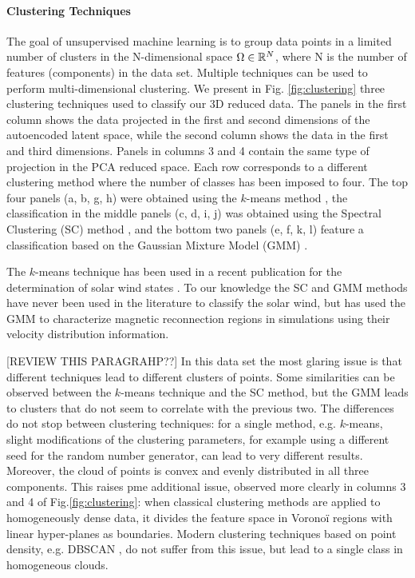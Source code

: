 \paragraph{Clustering Techniques}
The goal of unsupervised machine learning is to group data points in a limited number of clusters in the N-dimensional space $\Omega\in\Bbb R^N$, where N is the number of features (components) in the data set. Multiple techniques can be used to perform multi-dimensional clustering. We present in Fig. \ref{fig:clustering} three clustering techniques used to classify our 3D reduced data. The panels in the first column shows the data projected in the first and second dimensions of the autoencoded latent space, while the second column shows the data in the first and third dimensions. Panels in columns 3 and 4 contain the same type of projection in the PCA reduced space. Each row corresponds to a different clustering method where the number of classes has been imposed to four. The top four panels (a, b, g, h) were obtained using the $k$-means method \citep{[REF??]}, the classification in the middle panels (c, d, i, j) was obtained using the Spectral Clustering (SC) method \citep{[REF??]}, and the bottom two panels (e, f, k, l) feature a classification based on the Gaussian Mixture Model (GMM) \citep{[REF??]}.

The $k$-means technique has been used in a recent publication for the determination of solar wind states \citep{Roberts2020}. To our knowledge the SC and GMM methods have never been used in the literature to classify the solar wind, but \citep{Dupuis2020} has used the GMM to characterize magnetic reconnection regions in simulations using their velocity distribution information.

[REVIEW THIS PARAGRAHP??]
In this data set the most glaring issue is that different techniques lead to different clusters of points. Some similarities can be observed between the $k$-means technique and the SC method, but the GMM leads to clusters that do not seem to correlate with the previous two. The differences do not stop between clustering techniques: for a single method, e.g. $k$-means, slight modifications of the clustering parameters, for example using a different seed for the random number generator, can lead to very different results. Moreover, the cloud of points is convex and evenly distributed in all three components. This raises pme additional issue, observed more clearly in columns 3 and 4 of Fig.\ref{fig:clustering}: when classical clustering methods are applied to homogeneously dense data, it divides the feature space in Vorono\"i regions with linear hyper-planes as boundaries. Modern clustering techniques based on point density, e.g. DBSCAN \citep{[REF newDBSCAN paper??]}, do not suffer from this issue, but lead to a single class in homogeneous clouds.

